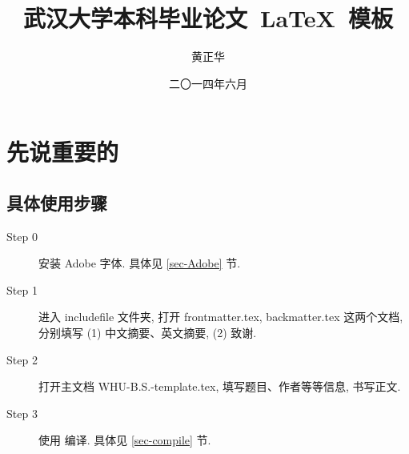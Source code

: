 \documentclass{whuBSthesis}%
\begin{document}

\miji{ }                                      %

\title{武汉大学本科毕业论文~\LaTeX~模板}
\author{黄正华}                            %
\date{二〇一四年六月}                    %










\maketitle
\frontmatter
{}              %
\tableofcontents
\mainmatter %
\chapter{先说重要的}
 
\section{具体使用步骤}
\begin{description}
  \item[Step 0]  安装 Adobe 字体. 具体见 \ref{sec-Adobe} 节.
  \item[Step 1]  进入 includefile 文件夹,  打开 frontmatter.tex, backmatter.tex 这两个文档,
        分别填写 (1) 中文摘要、英文摘要, (2) 致谢.

  \item[Step 2]  打开主文档 WHU-B.S.-template.tex, 填写题目、作者等等信息, 书写正文.

  \item[Step 3]  使用 \XeLaTeX{} 编译. 具体见 \ref{sec-compile} 节.


\end{description}
\end{document}
